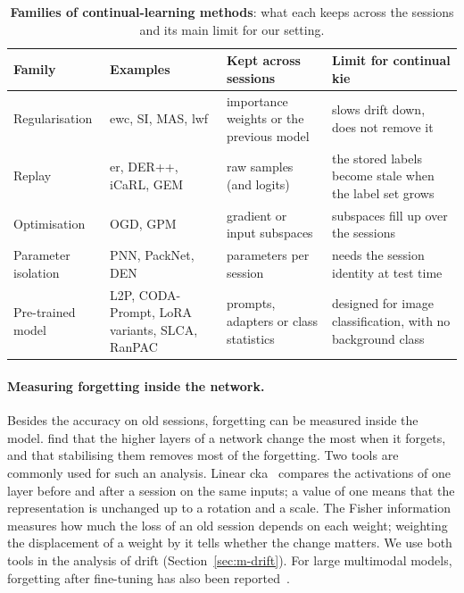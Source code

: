 \begin{table}[!htbp]
  \centering
  \caption[Families of continual-learning methods]{\textbf{Families of continual-learning
  methods}: what each keeps across the sessions and its main limit for our setting.}
  \label{tab:cl-families}
  \small
  \begin{tabularx}{\textwidth}{@{}>{\raggedright\arraybackslash}p{2.4cm} >{\raggedright\arraybackslash}p{3.1cm} >{\raggedright\arraybackslash}p{3.0cm} >{\raggedright\arraybackslash}X@{}}
    \toprule
    Family & Examples & Kept across sessions & Limit for continual \gls{kie} \\
    \midrule
    Regularisation & \gls{ewc}, SI, MAS, \gls{lwf} & importance weights or the previous
      model & slows drift down, does not remove it \\
    Replay & \gls{er}, DER++, iCaRL, GEM & raw samples (and logits) & the stored labels
      become stale when the label set grows \\
    Optimisation & OGD, GPM & gradient or input subspaces & subspaces fill up over the
      sessions \\
    Parameter isolation & PNN, PackNet, DEN & parameters per session & needs the session
      identity at test time \\
    Pre-trained model & L2P, CODA-Prompt, LoRA variants, SLCA, RanPAC & prompts, adapters
      or class statistics & designed for image classification, with no background class \\
    \bottomrule
  \end{tabularx}
\end{table}

\paragraph{Measuring forgetting inside the network.} Besides the accuracy on old sessions,
forgetting can be measured inside the model. \citet{ramasesh2021anatomy} find that the
higher layers of a network change the most when it forgets, and that stabilising them
removes most of the forgetting. Two tools are commonly used for such an analysis. Linear
\gls{cka}~\citep{kornblith2019similarity} compares the
activations of one layer before and after a session on the same inputs; a value of one
means that the representation is unchanged up to a rotation and a scale. The Fisher
information~\citep{amari1998natural,kirkpatrick2017ewc} measures how much the loss of an
old session depends on each weight; weighting the displacement of a weight by it tells
whether the change matters. We use both tools in the analysis of drift
(Section~\ref{sec:m-drift}). For large multimodal models, forgetting after fine-tuning has
also been reported~\citep{zhai2023investigating}.

